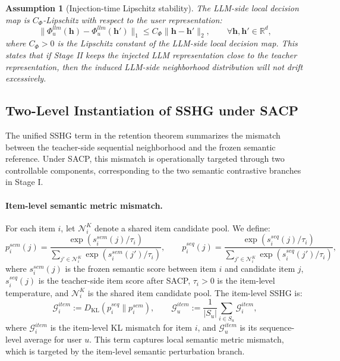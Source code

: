 ﻿\documentclass{article}
\newtheorem{assumption}{Assumption}[section]
\begin{document}
\begin{assumption}[Injection-time Lipschitz stability]
\label{asm:lipschitz}
The LLM-side local decision map is $C_\Phi$-Lipschitz with respect to the user representation:
\begin{equation}
\|\Phi_u^{llm}(\mathbf{h})-\Phi_u^{llm}(\mathbf{h}')\|_1
\le
C_\Phi\|\mathbf{h}-\mathbf{h}'\|_2,
\qquad
\forall \mathbf{h},\mathbf{h}'\in\mathbb R^d,
\label{eq:lipschitz_llm}
\end{equation}
where $C_\Phi>0$ is the Lipschitz constant of the LLM-side local decision map.
This states that if Stage II keeps the injected LLM representation close to the teacher representation, then the induced LLM-side neighborhood distribution will not drift excessively.
\end{assumption}

\subsection{Two-Level Instantiation of SSHG under SACP}
\label{app:two_level_sshg}

The unified SSHG term in the retention theorem summarizes the mismatch between the teacher-side sequential neighborhood and the frozen semantic reference. Under SACP, this mismatch is operationally targeted through two controllable components, corresponding to the two semantic contrastive branches in Stage I.

\paragraph{Item-level semantic metric mismatch.}
For each item $i$, let $\mathcal N_i^K$ denote a shared item candidate pool. We define:
\begin{equation}
p_i^{sem}(j)
=
\frac{\exp(s_i^{sem}(j)/\tau_i)}
{\sum_{j'\in\mathcal N_i^K}\exp(s_i^{sem}(j')/\tau_i)},
\qquad
p_i^{seq}(j)
=
\frac{\exp(s_i^{seq}(j)/\tau_i)}
{\sum_{j'\in\mathcal N_i^K}\exp(s_i^{seq}(j')/\tau_i)},
\label{eq:item_soft_dist}
\end{equation}
where $s_i^{sem}(j)$ is the frozen semantic score between item $i$ and candidate item $j$, $s_i^{seq}(j)$ is the teacher-side item score after SACP, $\tau_i>0$ is the item-level temperature, and $\mathcal N_i^K$ is the shared item candidate pool. The item-level SSHG is:
\begin{equation}
\mathcal G_i^{item}
:=
D_{\mathrm{KL}}(p_i^{seq}\|p_i^{sem}),
\qquad
\mathcal G_u^{item}
:=
\frac1{|S_u|}\sum_{i\in S_u}\mathcal G_i^{item},
\label{eq:item_sshg}
\end{equation}
where $\mathcal G_i^{item}$ is the item-level KL mismatch for item $i$, and $\mathcal G_u^{item}$ is its sequence-level average for user $u$. This term captures local semantic metric mismatch, which is targeted by the item-level semantic perturbation branch.
\end{document}
